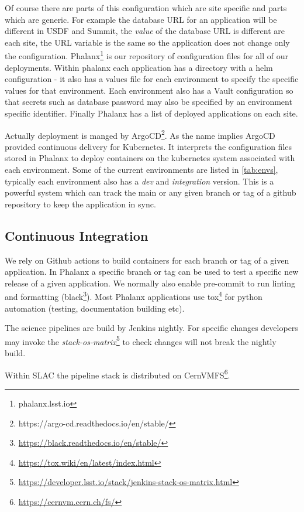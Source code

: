 Of course there are parts of this configuration which are site specific and parts which are generic.
For example the database URL for an application will be different in USDF and Summit, the \emph{value} of the database URL is different are each site, the URL variable is the same so the application does not change only the configuration.
Phalanx\footnote{phalanx.lsst.io} is our repository of configuration files for all of our deployments.
Within phalanx each application has a directory with a helm configuration - it also has a values file for each environment to specify the specific values for that environment.
Each environment also has a Vault configuration so that secrets such as database password may also be specified by an environment specific identifier.
Finally Phalanx has a list of deployed applications on each site.

Actually deployment is manged by ArgoCD\footnote{https://argo-cd.readthedocs.io/en/stable/}.
As the name implies ArgoCD provided continuous delivery for Kubernetes.
It interprets the configuration files stored in Phalanx to deploy containers on the kubernetes system associated with each environment.
Some of the current environments are listed in \autoref{tab:envs}, typically each environment also has a \emph{dev} and \emph{integration} version.
This is a powerful system which can track the main or any given branch or tag of a github repository to keep the application in sync.


\subsection{Continuous Integration}
We rely on Github actions to build containers for each branch or tag of a given application.
In Phalanx a specific branch or tag can be used to test a specific new release of a given application.
We normally also enable pre-commit to run linting and formatting (black\footnote{\url{https://black.readthedocs.io/en/stable/}}).
Most Phalanx applications use tox\footnote{\url{https://tox.wiki/en/latest/index.html}} for python automation (testing, documentation building etc).

The science pipelines are build by Jenkins nightly.
For specific changes developers may invoke the \emph{stack-os-matrix}\footnote{\url{https://developer.lsst.io/stack/jenkins-stack-os-matrix.html}} to check changes will not break the nightly build.

Within SLAC the pipeline stack is distributed on CernVMFS\footnote{\url{https://cernvm.cern.ch/fs/}}.



